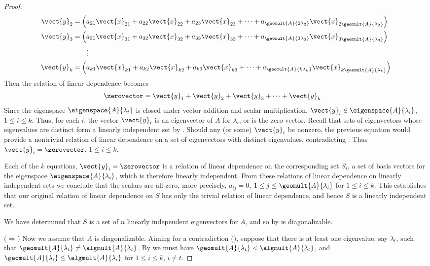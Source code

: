 \begin{proof}
\begin{align*}
\vect{y}_2&=\left(a_{21}\vect{x}_{21}+a_{22}\vect{x}_{22}+a_{23}\vect{x}_{23}+\cdots+a_{\geomult{A}{2\lambda_2}}\vect{x}_{2\geomult{A}{\lambda_2}}\right)\\
\vect{y}_3&=\left(a_{31}\vect{x}_{31}+a_{32}\vect{x}_{32}+a_{33}\vect{x}_{33}+\cdots+a_{\geomult{A}{3\lambda_3}}\vect{x}_{3\geomult{A}{\lambda_3}}\right)\\
&\quad\quad\vdots\\
\vect{y}_k&=\left(a_{k1}\vect{x}_{k1}+a_{k2}\vect{x}_{k2}+a_{k3}\vect{x}_{k3}+\cdots+a_{\geomult{A}{k\lambda_k}}\vect{x}_{k\geomult{A}{\lambda_k}}\right)
%
\end{align*}
%
Then the relation of linear dependence becomes
%
\begin{align*}
\zerovector&=\vect{y}_1+\vect{y}_2+\vect{y}_3+\cdots+\vect{y}_k
\end{align*}
%
Since the eigenspace $\eigenspace{A}{\lambda_i}$ is closed under vector addition and scalar multiplication, $\vect{y}_i\in\eigenspace{A}{\lambda_i}$, $1\leq i\leq k$.  Thus, for each $i$, the vector $\vect{y}_i$ is an eigenvector of $A$ for $\lambda_i$, or is the zero vector.  Recall that sets of eigenvectors whose eigenvalues are distinct form a linearly independent set by .  Should any (or some) $\vect{y}_i$ be nonzero, the previous equation would provide a nontrivial relation of linear dependence on a set of eigenvectors with distinct eigenvalues, contradicting .  Thus $\vect{y}_i=\zerovector$, $1\leq i\leq k$.\par
%
Each of the $k$ equations, $\vect{y}_i=\zerovector$ is a relation of linear dependence on the corresponding set $S_i$, a set of basis vectors for the eigenspace $\eigenspace{A}{\lambda_i}$, which is therefore linearly independent.  From these relations of linear dependence on linearly independent sets we conclude that the scalars are all zero, more precisely, $a_{ij}=0$, $1\leq j\leq\geomult{A}{\lambda_i}$ for $1\leq i\leq k$.  This establishes that our original relation of linear dependence on $S$ has only the trivial relation of linear dependence, and hence $S$ is a linearly independent set.\par
%
We have determined that $S$ is a set of $n$ linearly independent eigenvectors for $A$, and so by  is diagonalizable.\par
%
($\Rightarrow$)  Now we assume that $A$ is diagonalizable.  Aiming for a contradiction (), suppose that there is at least one eigenvalue, say $\lambda_t$, such that $\geomult{A}{\lambda_t}\neq\algmult{A}{\lambda_t}$.  By  we must have $\geomult{A}{\lambda_t}<\algmult{A}{\lambda_t}$, and $\geomult{A}{\lambda_i}\leq\algmult{A}{\lambda_i}$ for $1\leq i\leq k$, $i\neq t$.\par

\end{proof}
